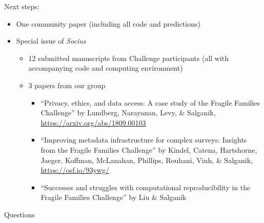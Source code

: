 \documentclass{beamer}
\begin{document}
\begin{frame}

Next steps:
\begin{itemize}
\item One community paper (including all code and predictions) \pause
\item Special issue of \textit{Socius}
\begin{itemize}
\item 12 submitted manuscripts from Challenge participants (all with accompanying code and computing environment) \pause
\item 3 papers from our group \pause
\begin{itemize}
\item ``Privacy, ethics, and data access: A case study of the Fragile Families Challenge'' by Lundberg, Narayanan, Levy, \& Salganik, \url{https://arxiv.org/abs/1809.00103} \pause
\item ``Improving metadata infrastructure for complex surveys: Insights from the Fragile Families Challenge'' by Kindel, Catena, Hartshorne, Jaeger, Koffman, McLanahan, Phillips, Rouhani, Vinh, \& Salganik, \url{https://osf.io/93ywg/} \pause
\item ``Successes and struggles with computational reproducibility in the Fragile Families Challenge'' by Liu \& Salganik
\end{itemize}
\end{itemize}
\end{itemize}

\end{frame}

\begin{frame}

{\Large
\begin{center}
Questions
\end{center}
}

\end{frame}
\end{document}
